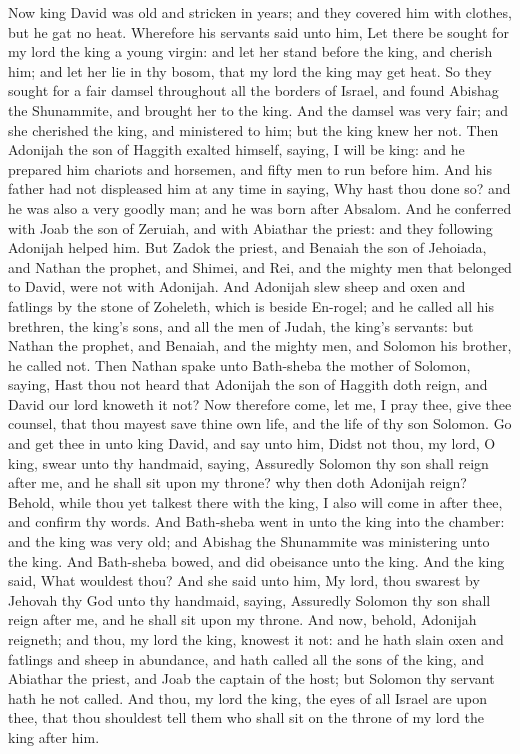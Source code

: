 


Now king David was old and stricken in years; and they covered him with clothes, but he gat no heat. Wherefore his servants said unto him, Let there be sought for my lord the king a young virgin: and let her stand before the king, and cherish him; and let her lie in thy bosom, that my lord the king may get heat. So they sought for a fair damsel throughout all the borders of Israel, and found Abishag the Shunammite, and brought her to the king. And the damsel was very fair; and she cherished the king, and ministered to him; but the king knew her not.  Then Adonijah the son of Haggith exalted himself, saying, I will be king: and he prepared him chariots and horsemen, and fifty men to run before him. And his father had not displeased him at any time in saying, Why hast thou done so? and he was also a very goodly man; and he was born after Absalom. And he conferred with Joab the son of Zeruiah, and with Abiathar the priest: and they following Adonijah helped him. But Zadok the priest, and Benaiah the son of Jehoiada, and Nathan the prophet, and Shimei, and Rei, and the mighty men that belonged to David, were not with Adonijah. And Adonijah slew sheep and oxen and fatlings by the stone of Zoheleth, which is beside En-rogel; and he called all his brethren, the king’s sons, and all the men of Judah, the king’s servants: but Nathan the prophet, and Benaiah, and the mighty men, and Solomon his brother, he called not.  Then Nathan spake unto Bath-sheba the mother of Solomon, saying, Hast thou not heard that Adonijah the son of Haggith doth reign, and David our lord knoweth it not? Now therefore come, let me, I pray thee, give thee counsel, that thou mayest save thine own life, and the life of thy son Solomon. Go and get thee in unto king David, and say unto him, Didst not thou, my lord, O king, swear unto thy handmaid, saying, Assuredly Solomon thy son shall reign after me, and he shall sit upon my throne? why then doth Adonijah reign? Behold, while thou yet talkest there with the king, I also will come in after thee, and confirm thy words.  And Bath-sheba went in unto the king into the chamber: and the king was very old; and Abishag the Shunammite was ministering unto the king. And Bath-sheba bowed, and did obeisance unto the king. And the king said, What wouldest thou? And she said unto him, My lord, thou swarest by Jehovah thy God unto thy handmaid, saying, Assuredly Solomon thy son shall reign after me, and he shall sit upon my throne. And now, behold, Adonijah reigneth; and thou, my lord the king, knowest it not: and he hath slain oxen and fatlings and sheep in abundance, and hath called all the sons of the king, and Abiathar the priest, and Joab the captain of the host; but Solomon thy servant hath he not called. And thou, my lord the king, the eyes of all Israel are upon thee, that thou shouldest tell them who shall sit on the throne of my lord the king after him. 